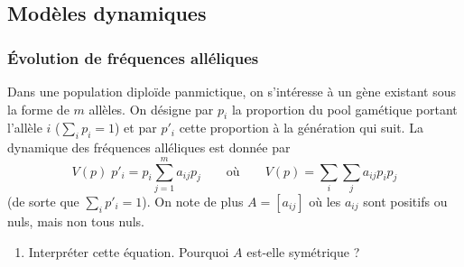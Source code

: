 
\subsection{Modèles dynamiques}%

\subsubsection{\'Evolution de fréquences alléliques}
Dans une population diploïde panmictique, on s’intéresse à un gène existant sous la forme de
$m$ allèles. On désigne par $p_i$ la proportion du pool gamétique portant l’allèle $i$ ($\sum_i p_i = 1$) et par $p'_i$ cette proportion à la génération qui suit. La dynamique des fréquences alléliques est donnée par
\begin{equation} \label{eq:dynFreqModele}
  V(p) \; p'_i = p_i \sum_{j=1}^m a_{ij} p_j 
  \qquad \text{où} \qquad
  V(p) = \sum_i \sum_j a_{ij} p_i p_j
\end{equation}
(de sorte que $\sum_i p'_i = 1$).
On note de plus $A = [a_{ij}]$ où les $a_{ij}$ sont positifs ou nuls, mais non tous nuls.

\begin{enumerate}
  \item Interpréter cette équation. Pourquoi $A$ est-elle symétrique ?
\end{enumerate}

